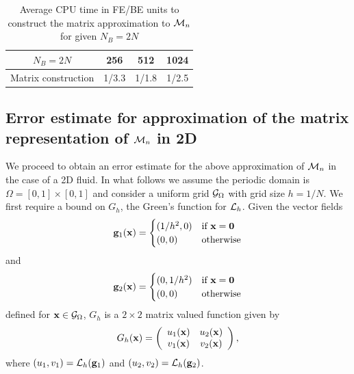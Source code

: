 \begin{table}
\begin{center}
\begin{tabular}{|c|c c c|}
\hline
$N_B=2N$ &  256  & 512 & 1024 \\
\hline
\textrm{Matrix construction} 
& 1/3.3  & 1/1.8 &  1/2.5 \\
\hline
\end{tabular}
\end{center}
\caption{Average CPU time in FE/BE units to construct the matrix approximation to $\mathcal{M}_n$ for given $N_B=2N$}
\label{Table:MConstruct}
\end{table}







\subsection{Error estimate for approximation of the matrix representation of $\mathcal{M}_n$ in 2D}
\label{sub:TranslationError_2D}
We proceed to obtain an error estimate for the above approximation of $\mathcal{M}_n$ in the case of a 2D fluid. In what follows we assume the periodic domain is $\Omega = [0,1]\times[0,1]$ and consider a uniform grid $\mathcal{G}_\Omega$ with grid size $h=1/N$. 
We first require a bound on $G_h$, the Green's function for $\mathcal{L}_h$.
Given the vector fields
\begin{equation}
\mathbf{g}_1(\mathbf{x}) = \begin{cases}
(1/h^2,0)& \textrm{if } \mathbf{x} = \mathbf{0} \\
(0,0)& \textrm{otherwise}
\end{cases}
\end{equation}
and
\begin{equation}
\mathbf{g}_2(\mathbf{x}) = \begin{cases}
(0,1/h^2)& \textrm{if } \mathbf{x} = \mathbf{0} \\
(0,0)& \textrm{otherwise}
\end{cases}
\end{equation}
defined for $\mathbf{x} \in \mathcal{G}_\Omega$, 
$G_h$ is a $2\times 2$ matrix valued function given by
\begin{equation}
G_h(\mathbf{x})=
\left( \begin{array}{cc}
u_1(\mathbf{x}) & u_2(\mathbf{x}) \\
v_1(\mathbf{x}) & v_2(\mathbf{x})
\end{array} \right),\label{meq:G_hDef}
\end{equation}
where $(u_1,v_1) = \mathcal{L}_h(\mathbf{g}_1)$ and $(u_2,v_2) = \mathcal{L}_h(\mathbf{g}_2)$.

